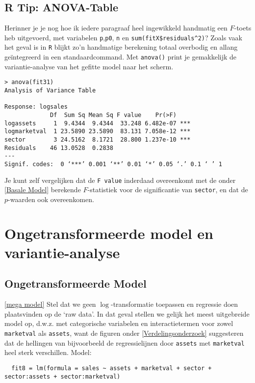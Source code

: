 \documentclass[a4paper]{report}
\begin{document}
\section{R Tip: ANOVA-Table}
  Herinner je je nog hoe ik iedere paragraaf heel ingewikkeld handmatig een $F$-toets heb uitgevoerd, met variabelen \verb!p!,\verb!p0!, \verb!n! en \verb!sum(fitX$residuals^2)!? Zoals vaak het geval is in \verb!R! blijkt zo'n handmatige berekening totaal overbodig en allang ge\"integreerd in een standaardcommand. Met \verb!anova()! print je gemakkelijk de variantie-analyse van het gefitte model naar het scherm.
  
\begin{verbatim}
> anova(fit31)
Analysis of Variance Table

Response: logsales
             Df  Sum Sq Mean Sq F value    Pr(>F)    
logassets     1  9.4344  9.4344  33.248 6.482e-07 ***
logmarketval  1 23.5890 23.5890  83.131 7.058e-12 ***
sector        3 24.5162  8.1721  28.800 1.237e-10 ***
Residuals    46 13.0528  0.2838                      
---
Signif. codes:  0 ‘***’ 0.001 ‘**’ 0.01 ‘*’ 0.05 ‘.’ 0.1 ‘ ’ 1
\end{verbatim}

  Je kunt zelf vergelijken dat de \verb!F value! inderdaad overeenkomt met de onder \ref{Basale Model} berekende $F$-statistiek voor de significantie van \verb!sector!, en dat de $p$-waarden ook overeenkomen. 

\chapter{Ongetransformeerde model en variantie-analyse}

\section{Ongetransformeerde Model}
\ref{mega model}
  Stel dat we geen $\log$-transformatie toepassen en regressie doen plaatsvinden op de `raw data'. In dat geval stellen we gelijk het meest uitgebreide model op, d.w.z. met categorische variabelen en interactietermen voor zowel \verb!marketval! als \verb!assets!, want de figuren onder \ref{Verdelingsonderzoek} suggesteren dat de hellingen van bijvoorbeeld de regressielijnen door \verb!assets! met \verb!marketval! heel sterk verschillen. Model:
  
  \begin{verbatim}
  fit8 = lm(formula = sales ~ assets + marketval + sector + sector:assets + sector:marketval)
  \end{verbatim}
  
\end{document}
